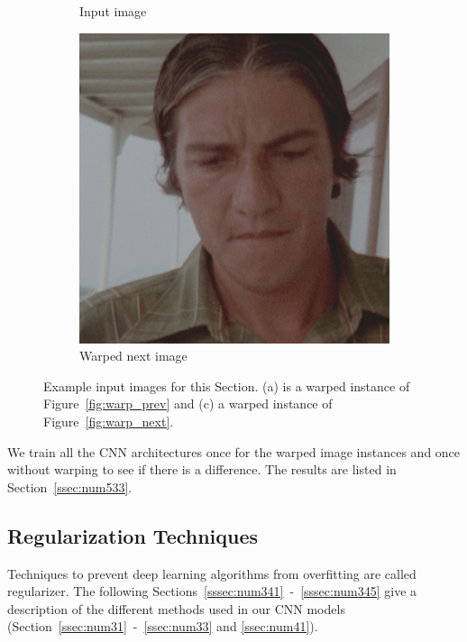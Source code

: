 \begin{figure}[H]
\begin{subfigure}{.3\textwidth}
		\caption[figure]{Input image}
		\label{fig:warp_warpinput}
	\end{subfigure}
	\begin{subfigure}{.3\textwidth}
		\centering
		\includegraphics[width=\linewidth]{warp/warpedNext.png}
		\caption[figure]{Warped next image}
		\label{fig:warp_warpnext}
	\end{subfigure}
	\caption[figure]{Example input images for this Section. (a) is a warped instance of Figure~\ref{fig:warp_prev} and (c) a warped instance of Figure~\ref{fig:warp_next}.}
	\label{fig:warp_2}
\end{figure}

We train all the CNN architectures once for the warped image instances and once without warping to see if there is a difference. The results are listed in Section~\ref{ssec:num533}.

\subsection{Regularization Techniques}
\label{ssec:num34}

Techniques to prevent deep learning algorithms from overfitting are called regularizer. The following Sections~\ref{sssec:num341}~-~\ref{sssec:num345} give a description of the different methods used in our CNN models (Section~\ref{ssec:num31}~-~\ref{ssec:num33} and \ref{ssec:num41}).

